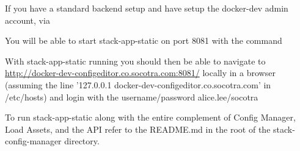 If you have a standard backend setup and have setup the docker-dev admin
account, via

\begin{Shaded}
\begin{Highlighting}[]
\end{Highlighting}
\end{Shaded}

You will be able to start stack-app-static on port 8081 with the command

\begin{Shaded}
\begin{Highlighting}[]
\end{Highlighting}
\end{Shaded}

With stack-app-static running you should then be able to navigate to
\href{http://docker-dev-configeditor.co.socotra.com:8081/}{http://docker-dev-configeditor.co.socotra.com:8081/}
locally in a browser (assuming the line '127.0.0.1
docker-dev-configeditor.co.socotra.com' in /etc/hosts) and login with
the username/password alice.lee/socotra

To run stack-app-static along with the entire complement of Config
Manager, Load Assets, and the API refer to the README.md in the root of
the stack-config-manager directory.
